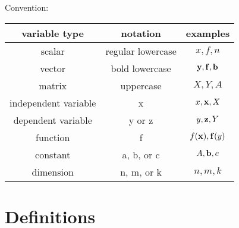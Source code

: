 \documentclass[12pt]{article}
\date{February 2020} %
\begin{document}
    Convention: \\

\begin{tabular}{c|c|c}
    variable type & notation & examples \\
    \hline
    scalar & regular lowercase & $x,f,n$ \\
    vector & bold lowercase & $\boldsymbol{\mathrm{y}},\boldsymbol{\mathrm{f}},\boldsymbol{\mathrm{b}}$ \\
    matrix & uppercase & $X,Y,A$ \\
    independent variable & x & $x,\boldsymbol{\mathrm{x}},X$ \\
    dependent variable & y or z & $y,\boldsymbol{\mathrm{z}},Y$ \\
    function & f & $f(\boldsymbol{\mathrm{x}}),\boldsymbol{\mathrm{f}}(y)$ \\
    constant & a, b, or c & $A,\boldsymbol{\mathrm{b}}, c$ \\
    dimension & n, m, or k & $n,m,k$ \\
\end{tabular}

\section{Definitions}
\end{document}
